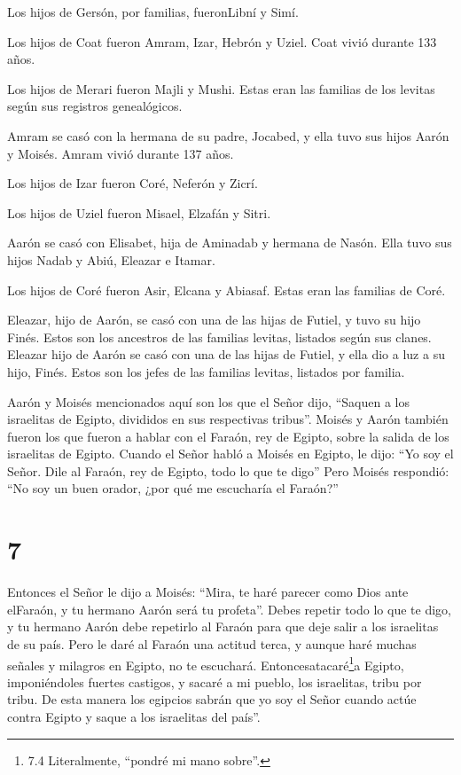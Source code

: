  Los hijos de Gersón, por familias, fueronLibní y Simí.

 Los hijos de Coat fueron Amram, Izar, Hebrón y Uziel. Coat
vivió durante 133 años.

 Los hijos de Merari fueron Majli y Mushi. Estas eran las
familias de los levitas según sus registros genealógicos.

 Amram se casó con la hermana de su padre, Jocabed, y ella
tuvo sus hijos Aarón y Moisés. Amram vivió durante 137 años.

 Los hijos de Izar fueron Coré, Neferón y Zicrí.

 Los hijos de Uziel fueron Misael, Elzafán y Sitri.

 Aarón se casó con Elisabet, hija de Aminadab y hermana de
Nasón. Ella tuvo sus hijos Nadab y Abiú, Eleazar e Itamar.

 Los hijos de Coré fueron Asir, Elcana y Abiasaf. Estas
eran las familias de Coré.

 Eleazar, hijo de Aarón, se casó con una de las hijas de
Futiel, y tuvo su hijo Finés. Estos son los ancestros de las familias
levitas, listados según sus clanes. Eleazar hijo de Aarón se casó con
una de las hijas de Futiel, y ella dio a luz a su hijo, Finés. Estos son
los jefes de las familias levitas, listados por familia.

 Aarón y Moisés mencionados aquí son los que el Señor dijo,
``Saquen a los israelitas de Egipto, divididos en sus respectivas
tribus''.  Moisés y Aarón también fueron los que fueron a
hablar con el Faraón, rey de Egipto, sobre la salida de los israelitas
de Egipto.  Cuando el Señor habló a Moisés en Egipto,
 le dijo: ``Yo soy el Señor. Dile al Faraón, rey de Egipto,
todo lo que te digo''  Pero Moisés respondió: ``No soy un
buen orador, ¿por qué me escucharía el Faraón?''

\hypertarget{section-6}{%
\section{7}\label{section-6}}

 Entonces el Señor le dijo a Moisés: ``Mira, te haré parecer
como Dios ante elFaraón, y tu hermano Aarón será tu profeta''.
 Debes repetir todo lo que te digo, y tu hermano Aarón debe
repetirlo al Faraón para que deje salir a los israelitas de su país.
 Pero le daré al Faraón una actitud terca, y aunque haré
muchas señales y milagros en Egipto, no te escuchará. 
Entoncesatacaré\footnote{7.4 Literalmente, ``pondré mi mano sobre''.}a
Egipto, imponiéndoles fuertes castigos, y sacaré a mi pueblo, los
israelitas, tribu por tribu.  De esta manera los egipcios
sabrán que yo soy el Señor cuando actúe contra Egipto y saque a los
israelitas del país''.

